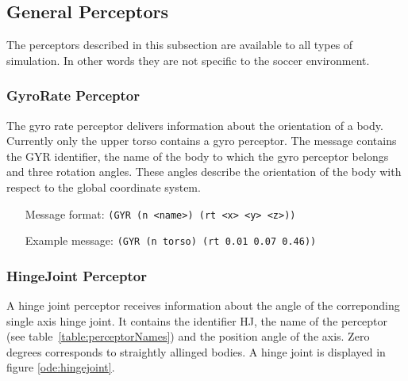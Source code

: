 \subsection{General Perceptors}
\label{sec:generalperceptors}

The perceptors described in this subsection are available to all types of
simulation. In other words they are not specific to the soccer environment.

\subsubsection{GyroRate Perceptor}
\label{sec:GYR}
The gyro rate perceptor delivers information about the orientation of a body.
Currently only the upper torso contains a gyro perceptor.
The message contains the GYR identifier, the name of the body to which the gyro
perceptor belongs and three rotation angles. These angles describe the
orientation of the body with respect to the global coordinate system.
\begin{itemize}
	\item[Message format:] \texttt{(GYR (n <name>) (rt <x> <y> <z>))}
	\item[Example message:] \texttt{(GYR (n torso) (rt 0.01 0.07 0.46))}
\end{itemize}


\subsubsection{HingeJoint Perceptor}
\label{sec:HJP}
A hinge joint perceptor receives information about the angle of the
correponding single axis hinge joint. It contains the identifier HJ, the name
of the perceptor (see table~\ref{table:perceptorNames}) and
the position angle of the axis. Zero degrees corresponds to straightly allinged bodies. A hinge joint is displayed
in figure \ref{ode:hingejoint}. 

